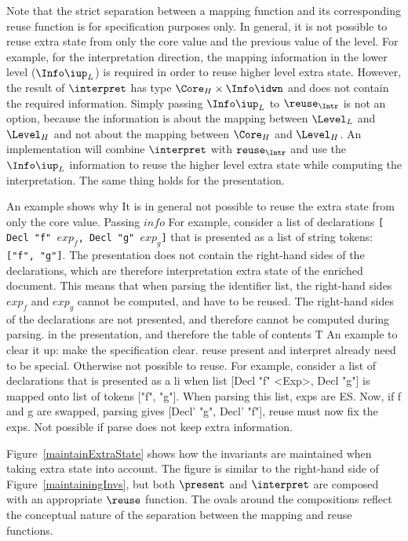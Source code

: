 Note that the strict separation between a mapping function and its corresponding reuse function is for specification purposes only. In general, it is not possible to reuse extra state from only the core value and the previous value of the level. For example, for the interpretation direction, the mapping information in the lower level ($\Info\iup_{L}$) is required in order to reuse higher level extra state. However, the result of 
$\interpret$ has type $\Core_{H}\times \Info\idwn$ and does not contain the required information. Simply passing $\Info\iup_{L}$ to $\reuse_{\Intr}$ is not an option, because the information is about the mapping between $\Level_{L}$ and $\Level_{H}$ and not about the mapping between $\Core_{H}$ and $\Level_{H}$. An implementation will combine $\interpret$ with ${\tt reuse_{\Intr}}$ and use the $\Info\iup_{L}$ information to reuse the higher level extra state while computing the interpretation. The same thing holds for the presentation.


\bc
 An example shows why It is in general not possible to reuse the extra state from only the core value. Passing $info$
For example, consider a list of declarations {\tt [ Decl "f" $exp_f$, Decl "g" $exp_g$]} that is presented as a list of string tokens: {\tt ["f", "g"]}. The presentation does not contain the right-hand sides of the declarations, which are therefore interpretation extra state of the enriched document. This means that when parsing the identifier list, the right-hand sides $exp_f$ and $exp_g$ cannot be computed, and have to be reused. 
The right-hand sides of the declarations are not presented, and therefore cannot be computed during parsing. in the presentation, and therefore the table of contents T
An example to clear it up:
 make the specification clear. 
 reuse present and interpret already need to be special. Otherwise not possible to reuse. For example, consider a list of declarations that is presented as a li when list [Decl "f" <Exp>, Decl "g"] is mapped onto list of tokens ["f", "g"]. When parsing this list, exps are ES. Now, if f and g are swapped, parsing gives [Decl' "g", Decl' "f"],  reuse must now fix the exps. Not possible if parse does not keep extra information.
\ec

Figure~\ref{maintainExtraState} shows how the invariants are maintained when taking extra state into account. The figure is similar to the right-hand side of Figure~\ref{maintainingInvs}, but both $\present$ and
 $\interpret$ are composed with an appropriate $\reuse$ function. The ovals around the compositions reflect the conceptual nature of the separation between the mapping and reuse functions. 

